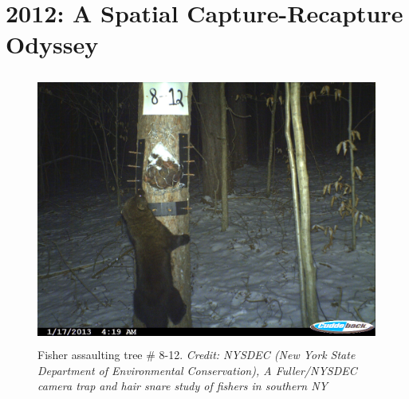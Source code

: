 \chapter{
2012: A Spatial Capture-Recapture Odyssey
}

\label{chapt.final}

\vspace{0.3cm}






\begin{figure}[h!]
\centering
\includegraphics[height=3.5in]{Ch20-Last/fisher.jpg}
\caption{
Fisher assaulting tree \# 8-12.
{\it Credit: NYSDEC (New York State Department of Environmental Conservation),
A Fuller/NYSDEC camera trap and hair snare study of fishers in
southern NY}
}
\label{last.fig.fisher}
\end{figure}

